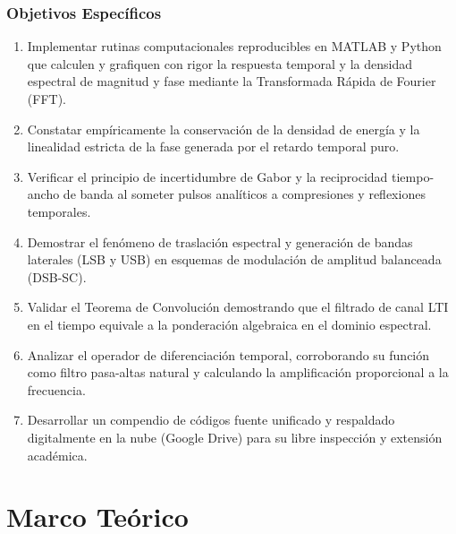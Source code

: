 \documentclass[11pt,a4paper]{article}
\begin{document}
\subsubsection{Objetivos Espec\'ificos}
\begin{enumerate}[label=\textbf{\arabic*.}]
  \item Implementar rutinas computacionales reproducibles en MATLAB y Python que calculen y grafiquen con rigor la respuesta temporal y la densidad espectral de magnitud y fase mediante la Transformada R\'apida de Fourier (FFT).
  \item Constatar emp\'iricamente la conservaci\'on de la densidad de energ\'ia y la linealidad estricta de la fase generada por el retardo temporal puro.
  \item Verificar el principio de incertidumbre de Gabor y la reciprocidad tiempo-ancho de banda al someter pulsos anal\'iticos a compresiones y reflexiones temporales.
  \item Demostrar el fen\'omeno de traslaci\'on espectral y generaci\'on de bandas laterales (LSB y USB) en esquemas de modulaci\'on de amplitud balanceada (DSB-SC).
  \item Validar el Teorema de Convoluci\'on demostrando que el filtrado de canal LTI en el tiempo equivale a la ponderaci\'on algebraica en el dominio espectral.
  \item Analizar el operador de diferenciaci\'on temporal, corroborando su funci\'on como filtro pasa-altas natural y calculando la amplificaci\'on proporcional a la frecuencia.
  \item Desarrollar un compendio de c\'odigos fuente unificado y respaldado digitalmente en la nube (Google Drive) para su libre inspecci\'on y extensi\'on acad\'emica.
\end{enumerate}

\section{Marco Te\'orico}
\end{document}
